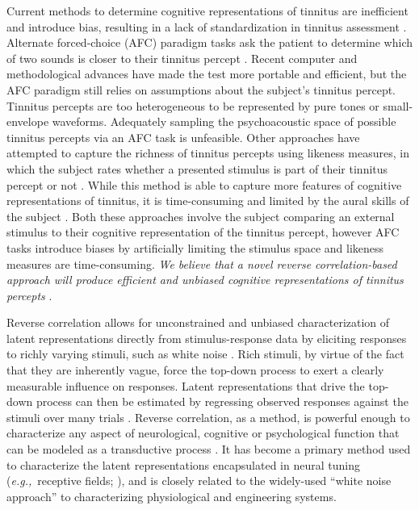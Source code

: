 \documentclass[11pt, notitlepage]{article} %
\def\eg{{\emph{e.g.,}}~}
\begin{document}
Current methods to determine cognitive representations of tinnitus
are inefficient and introduce bias, resulting in a lack of standardization in tinnitus assessment \cite{henryTinnitusEpidemiologicPerspective2020}.
Alternate forced-choice (AFC) paradigm tasks ask the patient to determine which of two sounds
is closer to their tinnitus percept
\cite{henryComparisonTwoComputerautomated2001,henryComputerautomatedTinnitusAssessment2004,henryComputerautomatedTinnitusAssessment2013,korthOneStepCloser2020}.
Recent computer and methodological advances have made the test more portable and efficient,
but the AFC paradigm still relies on assumptions about the subject's tinnitus percept.
Tinnitus percepts are too heterogeneous to be represented by pure tones or small-envelope waveforms.
Adequately sampling the psychoacoustic space of possible tinnitus percepts via an AFC task is unfeasible.
Other approaches have attempted to capture the richness of tinnitus percepts using likeness measures,
in which the subject rates whether a presented stimulus is part of their tinnitus percept or not \cite{norenaPsychoacousticCharacterizationTinnitus2002}.
While this method is able to capture more features of cognitive representations of tinnitus,
it is time-consuming and limited by the aural skills of the subject \cite{vajsakovicPrinciplesMethodsPsychoacoustic2021}.
Both these approaches involve the subject comparing an external stimulus to their cognitive representation of the tinnitus percept,
however AFC tasks introduce biases by artificially limiting the stimulus space and likeness measures are time-consuming.
\emph{We believe that a novel reverse correlation-based approach will produce efficient and unbiased cognitive representations of tinnitus percepts}
\cite{gosselinSuperstitiousPerceptionsReveal2003}.

Reverse correlation allows for unconstrained and unbiased
characterization of latent representations directly from stimulus-response data by eliciting responses to
richly varying stimuli, such as white noise \cite{marmarelisWhiteNoiseMethodSystem1978, nishimotoReceptiveFieldProperties2006}.
Rich stimuli, by virtue of the fact that they are inherently vague, force the top-down process to exert a clearly
measurable influence on responses. Latent representations that drive the top-down process can then be
estimated by regressing observed responses against the stimuli over many trials \cite{mineaultImprovedClassificationImages2009}.
Reverse correlation, as a method, is powerful enough to characterize any aspect of neurological,
cognitive or psychological function that can be modeled as a transductive process \cite{ringachReverseCorrelationNeurophysiology2004}.
It has become a primary method used to characterize the latent representations encapsulated in neural tuning
(\eg receptive fields; \cite{ringachReverseCorrelationNeurophysiology2004}), and is closely related to the widely-used ``white noise approach'' to
characterizing physiological \cite{marmarelisWhiteNoiseMethodSystem1978} and engineering \cite{ljungMeasureLackFit1978} systems. 
\end{document}
